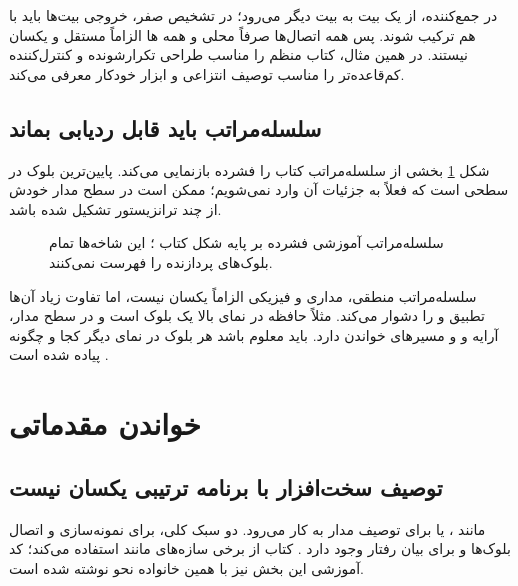 در جمع‌کننده،  از یک بیت به بیت دیگر می‌رود؛
در تشخیص صفر، خروجی بیت‌ها باید با هم ترکیب شوند.
پس همه اتصال‌ها صرفاً محلی و همه ها الزاماً مستقل و یکسان نیستند.
در همین مثال، کتاب  منظم را مناسب طراحی تکرارشونده و کنترل‌کننده
کم‌قاعده‌تر را مناسب توصیف انتزاعی و ابزار خودکار معرفی می‌کند.

\subsection{سلسله‌مراتب باید قابل ردیابی بماند}
شکل \ref{fig:logic-hierarchy} بخشی از سلسله‌مراتب کتاب را فشرده بازنمایی می‌کند.
 پایین‌ترین بلوک در سطحی است که فعلاً به جزئیات آن وارد نمی‌شویم؛
ممکن است در سطح مدار خودش از چند ترانزیستور تشکیل شده باشد.

\begin{figure}[ht]
\centering
\begin{latin}
\end{latin}
\caption{سلسله‌مراتب آموزشی فشرده بر پایه شکل  کتاب \cite{weste}؛
این شاخه‌ها تمام بلوک‌های پردازنده را فهرست نمی‌کنند.}
\label{fig:logic-hierarchy}
\end{figure}

سلسله‌مراتب منطقی، مداری و فیزیکی الزاماً یکسان نیست، اما تفاوت زیاد آن‌ها
تطبیق و  را دشوار می‌کند.
مثلاً حافظه در نمای بالا یک بلوک است و در سطح مدار، آرایه و  و مسیرهای
خواندن دارد. باید معلوم باشد هر بلوک در نمای دیگر کجا و چگونه پیاده شده است
\cite[بخش ]{weste}.

\section{خواندن مقدماتی }
\subsection{توصیف سخت‌افزار با برنامه ترتیبی یکسان نیست}
 مانند ،
 یا  برای توصیف مدار به کار می‌رود.
دو سبک کلی،  برای نمونه‌سازی و اتصال بلوک‌ها و
 برای بیان رفتار وجود دارد
\cite[بخش ]{weste}\cite[اسلایدهای ۱۹ و ۲۰]{intro}.
کتاب از برخی سازه‌های  مانند  استفاده می‌کند؛
کد آموزشی این بخش نیز با همین خانواده نحو نوشته شده است.

